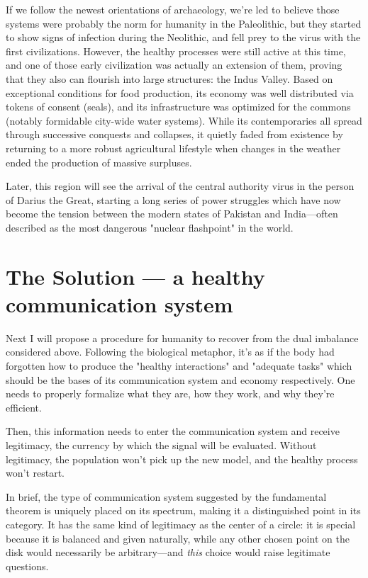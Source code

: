 \documentclass[11pt]{article}
\begin{document}
If we follow the newest orientations of archaeology, we're led to believe those systems
were probably the norm for humanity in the Paleolithic, but they started to show signs
of infection during the Neolithic, and fell prey to the virus with the first
civilizations. However, the healthy processes were still active at this time, and one of
those early civilization was actually an extension of them, proving that they also can
flourish into large structures: the Indus Valley. Based on exceptional conditions for
food production, its economy was well distributed via tokens of consent (seals), and its
infrastructure was optimized for the commons (notably formidable city-wide water
systems). While its contemporaries all spread through successive conquests and
collapses, it quietly faded from existence by returning to a more robust agricultural
lifestyle when changes in the weather ended the production of massive surpluses.

Later, this region will see the arrival of the central authority virus in the person of
Darius the Great, starting a long series of power struggles which have now become the
tension between the modern states of Pakistan and India---often described as the most
dangerous "nuclear flashpoint" in the world.

\par\bigskip

\section*{The Solution --- a healthy communication system}

Next I will propose a procedure for humanity to recover from the dual imbalance
considered above. Following the biological metaphor, it's as if the body had forgotten
how to produce the "healthy interactions" and "adequate tasks" which should be the bases
of its communication system and economy respectively. One needs to properly formalize
what they are, how they work, and why they're efficient.

Then, this information needs to enter the communication system and receive legitimacy,
the currency by which the signal will be evaluated. Without legitimacy, the population
won't pick up the new model, and the healthy process won't restart.

In brief, the type of communication system suggested by the fundamental theorem is
uniquely placed on its spectrum, making it a distinguished point in its category. It has
the same kind of legitimacy as the center of a circle: it is special because it is
balanced and given naturally, while any other chosen point on the disk would necessarily
be arbitrary---and \emph{this} choice would raise legitimate questions.
\end{document}
